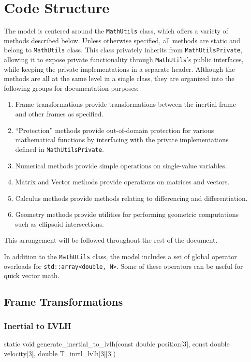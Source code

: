 \documentclass[11pt,fleqn]{report}
\begin{document}
\section{Code Structure}
The model is centered around the \texttt{MathUtils} class, which offers a variety of methods
described below. Unless otherwise specified, all methods are static and belong to 
\texttt{MathUtils} class. This class privately inherits from \texttt{MathUtilsPrivate},
allowing it to expose private functionality through \texttt{MathUtils}'s public interfaces,
while keeping the private implementations in a separate header. Although the methods are 
all at the same level in a single class, they are organized into the following groups for
documentation purposes:
\begin{enumerate}
\item Frame transformations provide transformations between the inertial frame
and other frames as specified.
\item ``Protection'' methods provide out-of-domain protection for various
mathematical functions by interfacing with the private implementations
defined in \texttt{MathUtilsPrivate}.
\item Numerical methods provide simple operations on single-value variables.
\item Matrix and Vector methods provide operations on matrices and vectors.
\item Calculus methods provide methods relating to differencing and
differentiation.
\item Geometry methods provide utilities for performing geometric computations
such as ellipsoid intersections.
\end{enumerate}

This arrangement will be followed throughout the rest of the document.

In addition to the \texttt{MathUtils} class, the model includes a set of global
operator overloads for \texttt{std::array<double, N>}. Some of these operators 
can be useful for quick vector math.

\subsection{Frame Transformations}
\subsubsection{Inertial to LVLH}
\begin{code}
static void generate_inertial_to_lvlh(const double position[3],
                                      const double velocity[3],
                                      double T_inrtl_lvlh[3][3])
\end{code}
\end{document}
